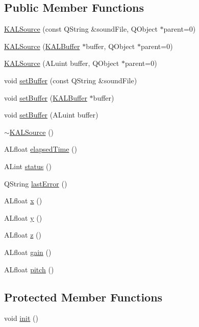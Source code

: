 \subsection*{Public Member Functions}
\begin{CompactItemize}
\item 
\hyperlink{class_k_a_l_source_b3b40eec42acf80fd6e4448eb3632215}{KALSource} (const QString \&soundFile, QObject $\ast$parent=0)
\item 
\hyperlink{class_k_a_l_source_db8a19fc41825ed536eb8d5235fcfff0}{KALSource} (\hyperlink{class_k_a_l_buffer}{KALBuffer} $\ast$buffer, QObject $\ast$parent=0)
\item 
\hyperlink{class_k_a_l_source_5daddf666e7bf2ecda0a29baa8db8f7c}{KALSource} (ALuint buffer, QObject $\ast$parent=0)
\item 
void \hyperlink{class_k_a_l_source_efc4601d63ec911b40346c1faef622ff}{setBuffer} (const QString \&soundFile)
\item 
void \hyperlink{class_k_a_l_source_9e0fe5ad33a2f814f3be868908b09821}{setBuffer} (\hyperlink{class_k_a_l_buffer}{KALBuffer} $\ast$buffer)
\item 
void \hyperlink{class_k_a_l_source_895cc3f7b79087050a97bed287b97178}{setBuffer} (ALuint buffer)
\item 
\hyperlink{class_k_a_l_source_668303aa25ec096eb945381a341bf16c}{$\sim$KALSource} ()
\item 
ALfloat \hyperlink{class_k_a_l_source_d408e9043f8ba7b87125b46ef9d99067}{elapsedTime} ()
\item 
ALint \hyperlink{class_k_a_l_source_299fc8e2cf4d544dd19ac92322f44e28}{status} ()
\item 
QString \hyperlink{class_k_a_l_source_e49f05979d560258949935990bb6540d}{lastError} ()
\item 
ALfloat \hyperlink{class_k_a_l_source_b276d46c5c13cf496bdc27d3d68b67dd}{x} ()
\item 
ALfloat \hyperlink{class_k_a_l_source_4caf310ccc6d374f14a1cbe08a15990b}{y} ()
\item 
ALfloat \hyperlink{class_k_a_l_source_dc2a64105db92ed96d91ec42c49878a3}{z} ()
\item 
ALfloat \hyperlink{class_k_a_l_source_f29819a83267c47424a4f3fab8281a41}{gain} ()
\item 
ALfloat \hyperlink{class_k_a_l_source_c3ed83870c78752ad17090840f54b6ab}{pitch} ()
\end{CompactItemize}
\subsection*{Protected Member Functions}
\begin{CompactItemize}
\item 
void \hyperlink{class_k_a_l_source_418bc777241fd144ffc392eff3fec919}{init} ()
\end{CompactItemize}


